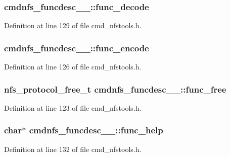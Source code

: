 \subsubsection[{func\_\-decode}]{ {\bf cmdnfs\_\-funcdesc\_\-\_\-::func\_\-decode}}\label{structcmdnfs__funcdesc_____1091f2be96698004533edf49409089bf}




Definition at line 129 of file cmd\_\-nfstools.h.
\subsubsection[{func\_\-encode}]{ {\bf cmdnfs\_\-funcdesc\_\-\_\-::func\_\-encode}}\label{structcmdnfs__funcdesc_____c3295b2ab9ae6c0047664185726426ae}




Definition at line 126 of file cmd\_\-nfstools.h.
\subsubsection[{func\_\-free}]{\setlength{\rightskip}{0pt plus 5cm}nfs\_\-protocol\_\-free\_\-t {\bf cmdnfs\_\-funcdesc\_\-\_\-::func\_\-free}}\label{structcmdnfs__funcdesc_____91a56da2c915171050310576a86961ce}




Definition at line 123 of file cmd\_\-nfstools.h.
\subsubsection[{func\_\-help}]{\setlength{\rightskip}{0pt plus 5cm}char$\ast$ {\bf cmdnfs\_\-funcdesc\_\-\_\-::func\_\-help}}\label{structcmdnfs__funcdesc_____69770d67708d4a228e5bbb0157b3392f}




Definition at line 132 of file cmd\_\-nfstools.h.
